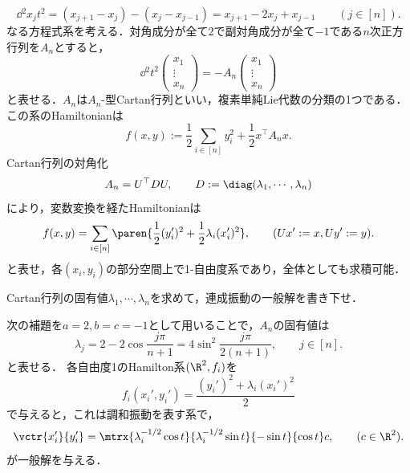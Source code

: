 \documentclass[uplatex,dvipdfmx]{jsreport}
\begin{document}
\begin{example}[連成振動]
    \[\dd{^2x_j}{t^2}=(x_{j+1}-x_j)-(x_j-x_{j-1})=x_{j+1}-2x_j+x_{j-1}\qquad(j\in[n]).\]
    なる方程式系を考える．対角成分が全て$2$で副対角成分が全て$-1$である$n$次正方行列を$A_n$とすると，
    \[\dd{^2}{t^2}\begin{pmatrix}x_1\\\vdots\\x_n\end{pmatrix}=-A_n\begin{pmatrix}x_1\\\vdots\\x_n\end{pmatrix}\]
    と表せる．$A_n$は$A_n$-型Cartan行列といい，複素単純Lie代数の分類の1つである．
    この系のHamiltonianは
    \[f(x,y):=\frac{1}{2}\sum_{i\in[n]}y_i^2+\frac{1}{2}x^\top A_nx.\]
    Cartan行列の対角化
    \[A_n=U^\top DU,\qquad D:=\diag(\lambda_1,\cdots,\lambda_n)\]
    により，変数変換を経たHamiltonianは
    \[f(x,y)=\sum_{i\in[n]}\paren{\frac{1}{2}(y'_i)^2+\frac{1}{2}\lambda_i(x_i')^2},\qquad(Ux':=x,Uy':=y).\]
    と表せ，各$(x_i,y_i)$の部分空間上で1-自由度系であり，全体としても求積可能．
\end{example}
\begin{problem}
    Cartan行列の固有値$\lambda_1,\cdots,\lambda_n$を求めて，連成振動の一般解を書き下せ．
\end{problem}
\begin{Proof}
    次の補題を$a=2,b=c=-1$として用いることで，$A_n$の固有値は
    \[\lambda_j=2-2\cos\frac{j\pi}{n+1}=4\sin^2\frac{j\pi}{2(n+1)},\qquad j\in[n].\]
    と表せる．
    各自由度1のHamilton系$(\R^2,f_i)$を
    \[f_i(x_i',y_i')=\frac{(y_i')^2+\lambda_i(x_i')^2}{2}\]
    で与えると，これは調和振動を表す系で，
    \[\vctr{x_i'}{y_i'}=\mtrx{\lambda_i^{-1/2}\cos t}{\lambda_i^{-1/2}\sin t}{-\sin t}{\cos t}c,\qquad(c\in\R^2).\]
    が一般解を与える．
\end{Proof}
\end{document}
